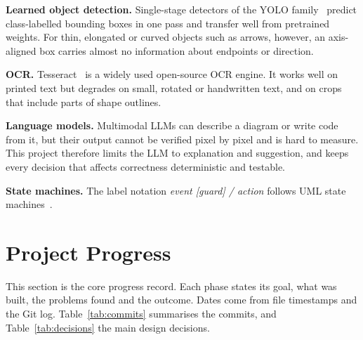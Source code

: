\documentclass[journal,10pt]{IEEEtran}
\begin{document}
\textbf{Learned object detection.} Single-stage detectors of the YOLO family~\cite{yolo11}
predict class-labelled bounding boxes in one pass and transfer well from pretrained
weights. For thin, elongated or curved objects such as arrows, however, an axis-aligned
box carries almost no information about endpoints or direction.

\textbf{OCR.} Tesseract~\cite{tesseract} is a widely used open-source OCR engine. It
works well on printed text but degrades on small, rotated or handwritten text, and on
crops that include parts of shape outlines.

\textbf{Language models.} Multimodal LLMs can describe a diagram or write code from it,
but their output cannot be verified pixel by pixel and is hard to measure. This project
therefore limits the LLM to explanation and suggestion, and keeps every decision that
affects correctness deterministic and testable.

\textbf{State machines.} The label notation \emph{event [guard] / action} follows UML
state machines~\cite{uml}.

\section{Project Progress}
\label{sec:progress}
This section is the core progress record. Each phase states its goal, what was built,
the problems found and the outcome. Dates come from file timestamps and the Git log.
Table~\ref{tab:commits} summarises the commits, and Table~\ref{tab:decisions} the main
design decisions.
\end{document}
